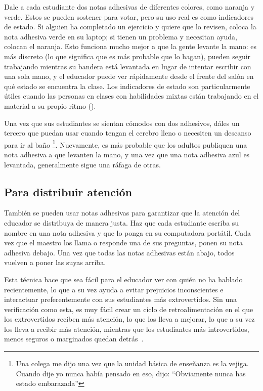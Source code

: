 Dale a cada estudiante dos notas adhesivas de diferentes colores,
como naranja y verde.
Estos se pueden sostener para votar,
pero su uso real es como indicadores de estado.
Si alguien ha completado un ejercicio y quiere que lo revisen,
coloca la nota adhesiva verde en su laptop;
si tienen un problema y necesitan ayuda,
colocan el naranja.
Esto funciona mucho mejor a que la gente levante la mano:
es más discreto (lo que significa que es más probable que lo hagan),
pueden seguir trabajando mientras su bandera está levantada en lugar de intentar escribir con una sola mano,
y el educador puede ver rápidamente desde el frente del salón en qué estado se encuentra la clase.
Los indicadores de estado son particularmente útiles cuando las personas en clases con habilidades mixtas
están trabajando en el material a su propio ritmo ().

Una vez que sus estudiantes se sientan cómodos con dos adhesivos,
dáles un tercero que puedan usar cuando tengan el cerebro lleno
o necesiten un descanso para ir al baño \footnote{Una colega me dijo una vez que
la unidad básica de enseñanza es la vejiga.
Cuando dije yo nunca había pensado en eso,
dijo: ``Obviamente nunca has estado embarazada''}.
Nuevamente,
es más probable que los adultos publiquen una nota adhesiva a que levanten la mano,
y una vez que una nota adhesiva azul es levantada,
generalmente sigue una ráfaga de otras.

\subsection*{Para distribuir atención}

También se pueden usar notas adhesivas para garantizar que la atención del educador se distribuya de manera justa.
Haz que cada estudiante escriba su nombre en una nota adhesiva
y que lo ponga en su computadora portátil.
Cada vez que el maestro los llama o responde una de sus preguntas,
ponen su nota adhesiva debajo.
Una vez que todas las notas adhesivas están abajo,
todos vuelven a poner las suyas arriba.

Esta técnica hace que sea fácil para el educador ver con quién no ha hablado recientemente,
lo que a su vez ayuda a evitar prejuicios inconscientes
e interactuar preferentemente con sus estudiantes más extrovertidos.
Sin una verificación como esta,
es muy fácil crear un ciclo de retroalimentación en el que los extrovertidos reciben más atención,
lo que los lleva a mejorar,
lo que a su vez los lleva a recibir más atención,
mientras que los estudiantes más introvertidos, menos seguros o marginados quedan detrás~\cite{Alvi1999,Juss2005}.

